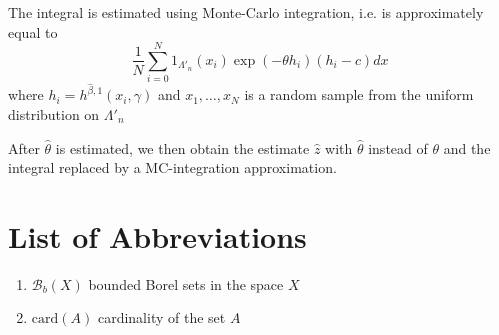 \documentclass[12pt,a4paper]{report}
\begin{document}
The integral is estimated using Monte-Carlo integration, i.e. is approximately equal to
$$ \frac 1N \sum_{i=0}^N 1_{\Lambda'_n}(x_i) \exp{\left( - \theta h_i \right )} (h_i- c) dx $$
where $h_i = h^{\hat\beta,1}(x_i, \gamma)$ and $x_1,\dots,x_N$ is a random sample from the uniform distribution on $\Lambda'_n$

After $\hat\theta$ is estimated, we then obtain the estimate $\hat z$ with $\hat\theta$ instead of $\theta$ and the integral replaced by a MC-integration approximation.


{}



\listoftodos

\section*{List of Abbreviations}
\begin{enumerate}
    \item $\mathcal B_b(X)$ bounded Borel sets in the space $X$
    \item $\text{card}(A)$ cardinality of the set $A$
\end{enumerate}
\end{document}
